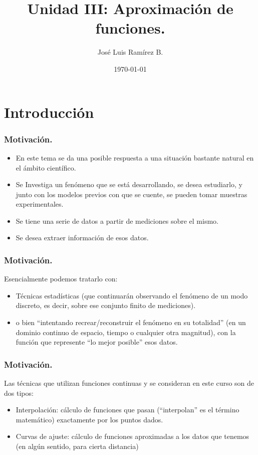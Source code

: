 \documentclass[10pt]{beamer}
\title{Unidad III: Aproximaci\'on de funciones.}
\author{Jos\'e Luis Ram\'irez B.}
\date{\today}
\begin{document}
\frame{\titlepage}

\frame{\tableofcontents}

\section{Introducci\'on}
\begin{frame}[fragile]
  \frametitle{Motivaci\'on.} 
  \begin{itemize}
   \item<1-> En este tema se da una posible respuesta a una situaci\'on
bastante natural en el \'ambito cient\'ifico.
    \item<2-> Se Investiga un fen\'omeno que se est\'a desarrollando, se desea estudiarlo, y junto
con los modelos previos con que se cuente, se pueden tomar
muestras experimentales.
    \item<3-> Se tiene una serie de datos a partir de
mediciones sobre el mismo.
    \item<4-> Se desea extraer informaci\'on de esos datos.
  \end{itemize}
\end{frame}
\begin{frame}[fragile]
  \frametitle{Motivaci\'on.}
  Esencialmente podemos tratarlo con:
\begin{itemize}
 \item<2-> T\'ecnicas estad\'isticas (que continuar\'an observando el fen\'omeno de un modo discreto, es decir, sobre ese conjunto finito de mediciones).
 \item<3-> o bien ``intentando recrear/reconstruir el fen\'omeno en su totalidad'' (en un dominio continuo de espacio, tiempo o cualquier otra magnitud), con la funci\'on que represente ``lo mejor posible'' esos datos.
\end{itemize}
\end{frame}
\frame
{
  \frametitle{Motivaci\'on.}
Las t\'ecnicas que utilizan funciones continuas y se consideran en este curso son de dos tipos:
\begin{itemize}
 \item<2-> Interpolaci\'on: c\'alculo de funciones que pasan (``interpolan'' es el t\'ermino matem\'atico) exactamente por los puntos dados.
 \item<3-> Curvas de ajuste: c\'alculo de funciones aproximadas a los datos que tenemos (en alg\'un sentido, para cierta distancia)
\end{itemize}
}
\end{document}
